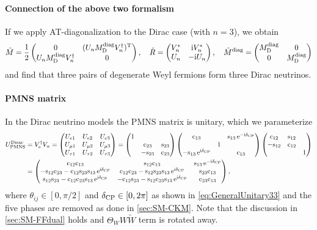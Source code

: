 \documentclass[CheatSheet]{subfiles}
\newcommand\MD[1][]{M_{\mathrm{D}#1}}
\begin{document}
\paragraph{Connection of the above two formalism}
If we apply AT-diagonalization to the Dirac case (with $n=3$), we obtain
\begin{align}
\tilde M = \frac12\pmat{0 & (U_n\MD\wdiag V_n^\dagger)^\TT \\ U_n\MD\wdiag V_n^\dagger & 0},\quad
  \tilde R=\pmat{V_n^* & \ii V_n^* \\ U_n & -\ii U_n},\quad
  \tilde M\wdiag=\pmat{\MD\wdiag & 0 \\ 0 & \MD\wdiag}
\end{align}
and find that three pairs of degenerate Weyl fermions form three Dirac neutrinos. 


\paragraph{PMNS matrix}\label{sec:PMNS}
In the Dirac neutrino models the PMNS matrix is unitary, which we parameterize
\begin{equation}
\begin{split}
   U_{\mathrm{PMNS}}^{\text{Dirac}}&=V_e^\dagger V_n
 =\begin{pmatrix}
 U_{e1} & U_{e2} & U_{e3}\\
 U_{\mu1} & U_{\mu2} & U_{\mu3}\\
 U_{\tau1} & U_{\tau2} & U_{\tau3}
 \end{pmatrix}
 =
 \begin{pmatrix}1&&\\&\mathrm{c}_{23}&\mathrm{s}_{23}\\&-\mathrm{s}_{23}&\mathrm{c}_{23}\end{pmatrix}
 \begin{pmatrix}\mathrm{c}_{13}&&\mathrm{s}_{13}\mathop{}\!\mathrm{e}^{-\mathrm{i}\delta_{\mathrm{CP}}}\\&1&\\-\mathrm{s}_{13}\mathop{}\!\mathrm{e}^{\mathrm{i}\delta_{\mathrm{CP}}}&&\mathrm{c}_{13}\end{pmatrix}
 \begin{pmatrix}\mathrm{c}_{12}&\mathrm{s}_{12}&\\-\mathrm{s}_{12}&\mathrm{c}_{12}&\\&&1\end{pmatrix}
 \\&=
 \begin{pmatrix}
 \mathrm{c}_{12} \mathrm{c}_{13} & \mathrm{s}_{12} \mathrm{c}_{13} & \mathrm{s}_{13} \mathop{}\!\mathrm{e}^{-\mathrm{i}\delta_{\mathrm{CP}}}\\
 -\mathrm{s}_{12} \mathrm{c}_{23} - \mathrm{c}_{12} \mathrm{s}_{23} \mathrm{s}_{13} \mathop{}\!\mathrm{e}^{\mathrm{i}\delta_{\mathrm{CP}}}& \mathrm{c}_{12} \mathrm{c}_{23} - \mathrm{s}_{12}\mathrm{s}_{23}\mathrm{s}_{13} \mathop{}\!\mathrm{e}^{\mathrm{i}\delta_{\mathrm{CP}}}& \mathrm{s}_{23}\mathrm{c}_{13}\\
  \mathrm{s}_{12}\mathrm{s}_{23} - \mathrm{c}_{12} \mathrm{c}_{23} \mathrm{s}_{13}\mathop{}\!\mathrm{e}^{\mathrm{i}\delta_{\mathrm{CP}}} & -\mathrm{c}_{12}\mathrm{s}_{23}-\mathrm{s}_{12}\mathrm{c}_{23}\mathrm{s}_{13}\mathop{}\!\mathrm{e}^{\mathrm{i}\delta_{\mathrm{CP}}} & \mathrm{c}_{23} \mathrm{c}_{13}
\end{pmatrix},
\end{split}
\end{equation}
where $\theta_{ij}\in[0,\pi/2]$ and $\delta_{\mathrm{CP}}\in[0,2\pi]$ as shown in \cref{eq:GeneralUnitary33} and the five phases are removed as done in \cref{sec:SM-CKM}.
Note that the discussion in \cref{sec:SM-FFdual} holds and $\Theta_W W\tilde W$ term is rotated away.
\end{document}
